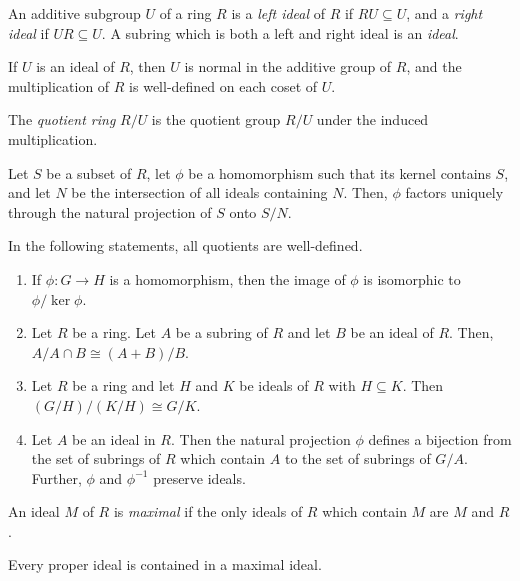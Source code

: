 \begin{defn}
    An additive subgroup $U$ of a ring $R$ is a \emph{left ideal} of $R$ if
    $RU\subseteq U$, and a \emph{right ideal} if $UR\subseteq U$. A subring
    which is both a left and right ideal is an \emph{ideal}.
\end{defn}
\begin{prop}
    If $U$ is an ideal of $R$, then $U$ is normal in the additive group of $R$,
    and the multiplication of $R$ is well-defined on each coset of $U$.
\end{prop}
\begin{defn}
    The \emph{quotient ring} $R/U$ is the quotient group $R/U$ under the induced
    multiplication.
\end{defn}
\begin{prop}
    Let $S$ be a subset of $R$, let $\phi$ be a homomorphism such that its
    kernel contains $S$, and let $N$ be the intersection of all ideals containing
    $N$. Then, $\phi$ factors uniquely through the natural projection of $S$
    onto $S/N$.
\end{prop}
\begin{thm}
    In the following statements, all quotients are well-defined.
    \begin{enumerate}
        \item If $\phi:G\to H$ is a homomorphism, then the image of $\phi$ is
            isomorphic to $\phi/\ker\phi$.
        \item Let $R$ be a ring. Let $A$ be a subring of $R$ and let $B$ be an
            ideal of $R$. Then, $A/A\cap B\cong (A+B)/B$.
        \item Let $R$ be a ring and let $H$ and $K$ be ideals of $R$
            with $H\subseteq K$. Then $(G/H)/(K/H)\cong G/K$.
        \item Let $A$ be an ideal in $R$. Then the natural projection $\phi$
            defines a bijection from the set of subrings of $R$ which contain
            $A$ to the set of subrings of $G/A$. Further, $\phi$ and $\phi^{-1}$
            preserve ideals.
    \end{enumerate}
\end{thm}
\begin{defn}
    An ideal $M$ of $R$ is \emph{maximal} if the only ideals of $R$ which
    contain $M$ are $M$ and $R$.
\end{defn}
\begin{prop}
    Every proper ideal is contained in a maximal ideal.
\end{prop}
